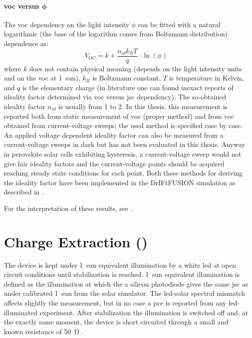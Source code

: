 \paragraph{\Gls{voc} versus $\bm{\phi}$}\label{methods_voc_intensity} The \gls{voc} dependency on the light intensity $\phi$ can be fitted with a natural logarithmic (the base of the logarithm comes from Boltzmann distribution) dependence as:
$$V_{OC} = k + \frac{n_{id} k_B T}{q}\cdot\ln(\phi)$$
where $k$ does not contain physical meaning (depends on the light intensity units and on the \gls{voc} at 1~sun), $k_B$ is Boltzmann constant, $T$ is temperature in Kelvin, and $q$ is the elementary charge\cite{Calado2018b} (in literature one can found inexact reports of ideality factor determined via \gls{voc} versus \gls{jsc} dependency). The so-obtained ideality factor $n_{id}$ is usually from 1 to 2. In this thesis, this measurement is reported both from static measurement of \gls{voc} (proper method) and from \gls{voc} obtained from current-voltage sweeps; the used method is specified case by case.	An applied voltage dependent ideality factor can also be measured from a current-voltage sweeps in dark but has not been evaluated in this thesis. Anyway in perovskite solar cells exhibiting hysteresis, a current-voltage sweep would not give fair ideality factors and the current-voltage points should be acquired reaching steady state conditions for each point. Both these methods for deriving the ideality factor have been implemented in the DrIFtFUSION simulation as described in .

For the interpretation of these results, see .

\section{Charge Extraction ()}

The device is kept under 1~sun equivalent illumination by a white \gls{led} at open circuit conditions until stabilization is reached. 1~sun equivalent illumination is defined as the illumination at which the a silicon photodiode gives the same \gls{jsc} as under calibrated 1~sun from the solar simulator. The \gls{led}-solar spectral mismatch affects slightly the measurement, but in no case a \gls{pce} is reported from any \gls{led}-illuminated experiment. After stabilization the illumination is switched off and, at the exactly same moment, the device is short circuited through a small and known resistance of \SI{50}{\ohm} \cite{Duffy2000}.

